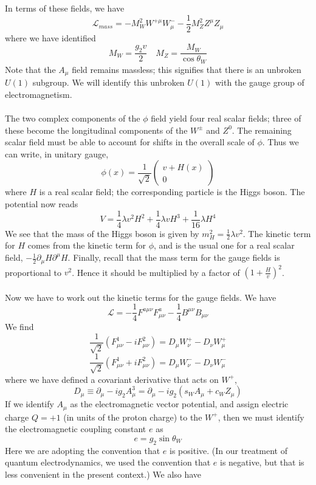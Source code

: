 \documentclass[cyan]{elegantnote}
\begin{document}
In terms of these fields, we have
\[\mathcal{L}_{mass} = -M_W^2 W^{+\mu} W^{-}_{\mu} - \frac{1}{2}M_Z^2 Z^{\mu}Z_{\mu}\]
where we have identified
\[M_W = \frac{g_2v}{2} \quad M_Z = \frac{M_W}{\cos\theta_W}\]
Note that the $A_{\mu}$ field remains massless; this signifies that there is an unbroken $U(1)$ subgroup. We will identify this unbroken $U(1)$ with the gauge
group of electromagnetism.
\\ \\
The two complex components of the $\phi$ field yield four real scalar fields; three of these become the longitudinal components of the $W^{\pm}$ and $Z^0$. The remaining scalar field must be able to account for shifts in the overall scale of $\phi$. Thus we can write, in unitary gauge,
\[\phi(x) = \frac{1}{\sqrt{2}} \begin{pmatrix}
v + H(x) \\ 0
\end{pmatrix}\]
where $H$ is a real scalar field; the corresponding particle is the Higgs boson. The potential now reads
\[V = \frac{1}{4}\lambda v^2H^2 + \frac{1}{4}\lambda v H^3 + \frac{1}{16}\lambda H^4\]
We see that the mass of the Higgs boson is given by $m_H^2 = \frac{1}{2}\lambda v^2$. The kinetic term for $H$ comes from the kinetic term for $\phi$, and is the usual one for a real scalar field, $-\frac{1}{2}\partial_{\mu}H \partial^{\mu}H$. Finally, recall that the mass term for the gauge fields is proportional to $v^2$. Hence it should be multiplied by a factor of $(1 + \frac{H}{v})^2$.
\\ \\
Now we have to work out the kinetic terms for the gauge fields. We have
\[\mathcal{L} = -\frac{1}{4}F^{a\mu\nu}F^a_{\mu\nu} - \frac{1}{4}B^{\mu\nu}B_{\mu\nu}\]
We find
\[\frac{1}{\sqrt{2}} (F^1_{\mu\nu} - iF^2_{\mu\nu}) = D_{\mu} W^+_{\nu} - D_{\nu}W^+_{\mu}\]
\[\frac{1}{\sqrt{2}} (F^1_{\mu\nu} + iF^2_{\mu\nu}) = D_{\mu} W^-_{\nu} - D_{\nu}W^-_{\mu}\]
where we have defined a covariant derivative that acts on
$W^+$,
\[D_{\mu} \equiv \partial_{\mu} - ig_2A^3_{\mu} = \partial_{\mu} - ig_2(s_WA_{\mu} + c_W Z_{\mu})\]
If we identify $A_{\mu}$ as the electromagnetic vector potential, and assign electric charge $Q = +1$ (in units of the proton charge) to the $W^+$, then we must identify the electromagnetic coupling constant $e$ as
\[e = g_2 \sin\theta_W\]
Here we are adopting the convention that $e$ is positive. (In our treatment of quantum electrodynamics, we used the convention that $e$ is negative, but that is less convenient in the present context.)
We also have
\end{document}
